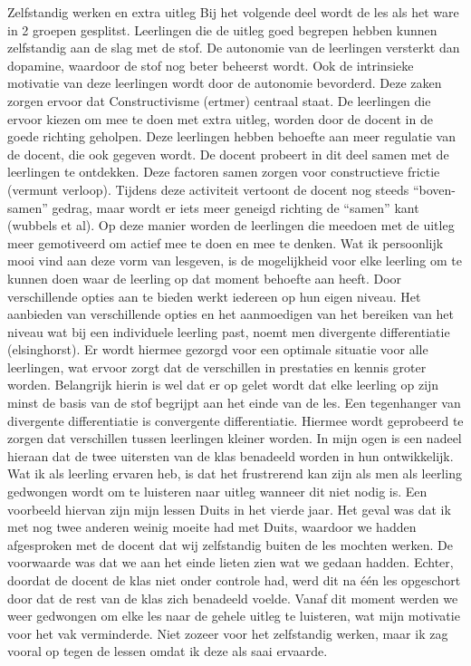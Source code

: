 \documentclass{article}
\begin{document}
{                Zelfstandig werken en extra uitleg
                Bij het volgende deel wordt de les als het ware in 2 groepen gesplitst. Leerlingen die de uitleg goed begrepen hebben kunnen zelfstandig aan de slag met de stof. De autonomie van de leerlingen versterkt dan dopamine, waardoor de stof nog beter beheerst wordt. Ook de intrinsieke motivatie van deze leerlingen wordt door de autonomie bevorderd. Deze zaken zorgen ervoor dat Constructivisme (ertmer) centraal staat.
                De leerlingen die ervoor kiezen om mee te doen met extra uitleg, worden door de docent in de goede richting geholpen. Deze leerlingen hebben behoefte aan meer regulatie van de docent, die ook gegeven wordt. De docent probeert in dit deel samen met de leerlingen te ontdekken. Deze factoren samen zorgen voor constructieve frictie (vermunt verloop). 
                Tijdens deze activiteit vertoont de docent nog steeds “boven-samen” gedrag, maar wordt er iets meer geneigd richting de “samen” kant (wubbels et al). Op deze manier worden de leerlingen die meedoen met de uitleg meer gemotiveerd om actief mee te doen en mee te denken.
                Wat ik persoonlijk mooi vind aan deze vorm van lesgeven, is de mogelijkheid voor elke leerling om te kunnen doen waar de leerling op dat moment behoefte aan heeft. Door verschillende opties aan te bieden werkt iedereen op hun eigen niveau. Het aanbieden van verschillende opties en het aanmoedigen van het bereiken van het niveau wat bij een individuele leerling past, noemt men divergente differentiatie (elsinghorst). Er wordt hiermee gezorgd voor een optimale situatie voor alle leerlingen, wat ervoor zorgt dat de verschillen in prestaties en kennis groter worden. Belangrijk hierin is wel dat er op gelet wordt dat elke leerling op zijn minst de basis van de stof begrijpt aan het einde van de les.
                Een tegenhanger van divergente differentiatie is convergente differentiatie. Hiermee wordt geprobeerd te zorgen dat verschillen tussen leerlingen kleiner worden. In mijn ogen is een nadeel hieraan dat de twee uitersten van de klas benadeeld worden in hun ontwikkelijk.
                Wat ik als leerling ervaren heb, is dat het frustrerend kan zijn als men als leerling gedwongen wordt om te luisteren naar uitleg wanneer dit niet nodig is. Een voorbeeld hiervan zijn mijn lessen Duits in het vierde jaar. Het geval was dat ik met nog twee anderen weinig moeite had met Duits, waardoor we hadden afgesproken met de docent dat wij zelfstandig buiten de les mochten werken. De voorwaarde was dat we aan het einde lieten zien wat we gedaan hadden. Echter, doordat de docent de klas niet onder controle had, werd dit na één les opgeschort door dat de rest van de klas zich benadeeld voelde. Vanaf dit moment werden we weer gedwongen om elke les naar de gehele uitleg te luisteren, wat mijn motivatie voor het vak verminderde. Niet zozeer voor het zelfstandig werken, maar ik zag vooral op tegen de lessen omdat ik deze als saai ervaarde.
                
}
\end{document}
